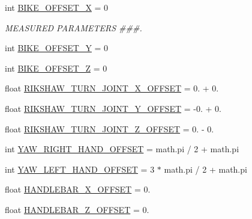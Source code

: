 \begin{DoxyCompactItemize}
\item 
int \mbox{\hyperlink{namespacesteering__capture__multiple__trajectories_a74b0a574d604840c326701f632ddcafb}{B\+I\+K\+E\+\_\+\+O\+F\+F\+S\+E\+T\+\_\+X}} = 0
\begin{DoxyCompactList}\small\item\em M\+E\+A\+S\+U\+R\+ED P\+A\+R\+A\+M\+E\+T\+E\+RS \#\#\#. \end{DoxyCompactList}\item 
int \mbox{\hyperlink{namespacesteering__capture__multiple__trajectories_ab8a927ab0e1c7d56504573bc88898fb5}{B\+I\+K\+E\+\_\+\+O\+F\+F\+S\+E\+T\+\_\+Y}} = 0
\item 
int \mbox{\hyperlink{namespacesteering__capture__multiple__trajectories_aca5080b6e47ef4c4f56bb2d951496be0}{B\+I\+K\+E\+\_\+\+O\+F\+F\+S\+E\+T\+\_\+Z}} = 0
\item 
float \mbox{\hyperlink{namespacesteering__capture__multiple__trajectories_a699bc2f7d1c69923d224da22a3544a53}{R\+I\+K\+S\+H\+A\+W\+\_\+\+T\+U\+R\+N\+\_\+\+J\+O\+I\+N\+T\+\_\+\+X\+\_\+\+O\+F\+F\+S\+ET}} = 0. + 0.
\item 
float \mbox{\hyperlink{namespacesteering__capture__multiple__trajectories_a254f6617251becee2e6a063f38870822}{R\+I\+K\+S\+H\+A\+W\+\_\+\+T\+U\+R\+N\+\_\+\+J\+O\+I\+N\+T\+\_\+\+Y\+\_\+\+O\+F\+F\+S\+ET}} = -\/0. + 0.
\item 
float \mbox{\hyperlink{namespacesteering__capture__multiple__trajectories_a6f42beb37c18fb8ed9e680fe6576575a}{R\+I\+K\+S\+H\+A\+W\+\_\+\+T\+U\+R\+N\+\_\+\+J\+O\+I\+N\+T\+\_\+\+Z\+\_\+\+O\+F\+F\+S\+ET}} = 0. -\/ 0.
\item 
int \mbox{\hyperlink{namespacesteering__capture__multiple__trajectories_a627b43b7325318f8172d5080e19b9db5}{Y\+A\+W\+\_\+\+R\+I\+G\+H\+T\+\_\+\+H\+A\+N\+D\+\_\+\+O\+F\+F\+S\+ET}} = math.\+pi / 2 + math.\+pi
\item 
int \mbox{\hyperlink{namespacesteering__capture__multiple__trajectories_afaa26504856c2662db5b0d5407560de5}{Y\+A\+W\+\_\+\+L\+E\+F\+T\+\_\+\+H\+A\+N\+D\+\_\+\+O\+F\+F\+S\+ET}} = 3 $\ast$ math.\+pi / 2 + math.\+pi
\item 
float \mbox{\hyperlink{namespacesteering__capture__multiple__trajectories_a04548f6a3365996390a4ec2f802e98f7}{H\+A\+N\+D\+L\+E\+B\+A\+R\+\_\+\+X\+\_\+\+O\+F\+F\+S\+ET}} = 0.
\item 
float \mbox{\hyperlink{namespacesteering__capture__multiple__trajectories_aa9cec6d2bd874a7f40b30551e83537e9}{H\+A\+N\+D\+L\+E\+B\+A\+R\+\_\+\+Z\+\_\+\+O\+F\+F\+S\+ET}} = 0.

\end{DoxyCompactItemize}
